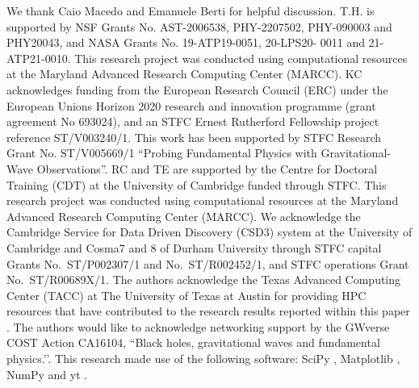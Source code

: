 \documentclass[aps,twocolumn,nofootinbib,superscriptaddress,amsfonts,floatfix
]{revtex4-1} %
\begin{document}
\acknowledgments We thank Caio Macedo and Emanuele Berti for helpful discussion.
T.H. is supported by NSF Grants No. AST-2006538, PHY-2207502, PHY-090003 and PHY20043, and NASA Grants No. 19-ATP19-0051, 20-LPS20- 0011 and 21-ATP21-0010. This research project was conducted using computational resources at the Maryland Advanced Research Computing Center (MARCC).
KC acknowledges funding from the European Research Council (ERC) under the European Unions Horizon 2020 research and innovation programme (grant agreement No 693024), and an STFC Ernest Rutherford Fellowship project reference ST/V003240/1.
This work has been supported by
STFC Research Grant No. ST/V005669/1
``Probing Fundamental Physics with Gravitational-Wave Observations''.
RC and TE are supported by the Centre for Doctoral Training
(CDT) at the University of Cambridge funded through STFC.
This research project was conducted using
computational resources at the Maryland Advanced Research Computing Center
(MARCC). We acknowledge the Cambridge Service for Data Driven Discovery (CSD3)
system at the University of Cambridge
and Cosma7 and 8 of Durham University through STFC capital Grants
No.~ST/P002307/1 and No.~ST/R002452/1, and STFC operations Grant
No.~ST/R00689X/1. The authors acknowledge the Texas Advanced Computing Center
(TACC) at The University of Texas at Austin for providing HPC resources that have contributed to the research results
reported within this paper \cite{10.1145/3311790.3396656}. The authors would
like to acknowledge networking support by the GWverse COST Action CA16104,
``Black holes, gravitational waves and fundamental physics.’’. This research
made use of the following software: SciPy \cite{jones_scipy_2001},  Matplotlib
\cite{Hunter:2007}, NumPy \cite{van2011numpy} and yt \cite{Turk_2010}.

\end{document}

